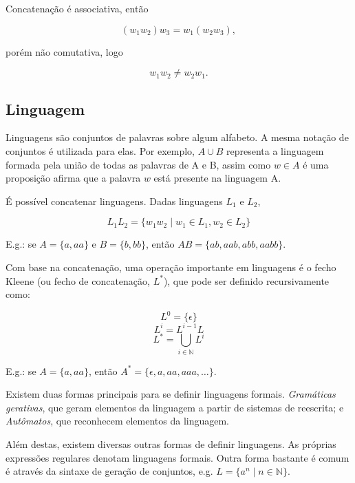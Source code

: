 \documentclass[a4paper,12pt,oneside,onecolumn]{uerj}
\begin{document}
Concatenação é associativa, então 

\begin{equation*}
(w_1w_2)w_3 = w_1(w_2w_3),
\end{equation*}

porém não comutativa, logo

\begin{equation*}
w_1w_2 \neq w_2w_1.
\end{equation*}

\subsection{Linguagem}

Linguagens são conjuntos de palavras sobre algum alfabeto. A mesma notação de conjuntos é utilizada para elas. Por exemplo, $A \cup B$ representa a linguagem formada pela união de todas as palavras de A e B, assim como $w \in A$ é uma proposição afirma que a palavra $w$ está presente na linguagem A.

É possível concatenar linguagens. Dadas linguagens $L_1$ e $L_2$,

\begin{equation*}
	L_1L_2 = \{w_1w_2 \mid w_1 \in L_1, w_2 \in L_2\}
\end{equation*}

E.g.: se $A = \{a, aa\}$ e $B = \{b, bb\}$, então $AB = \{ab, aab, abb, aabb\}$.


Com base na concatenação, uma operação importante em linguagens é o fecho Kleene (ou fecho de concatenação, $L^*$), que pode ser definido recursivamente como:

\begin{equation*}
	L^0 = \{\epsilon\}
\end{equation*}
\begin{equation*}
	L^i = L^{i-1}L
\end{equation*}
\begin{equation*}
	L^* = \bigcup_{i \in \mathbb{N}} L^i
\end{equation*}

E.g.: se $A = \{a, aa\}$, então $A^* = \{\epsilon, a, aa, aaa, \ldots\}$.

Existem duas formas principais para se definir linguagens formais. \emph{Gramáticas gerativas}, que geram elementos da linguagem a partir de sistemas de reescrita; e \emph{Autômatos}, que reconhecem elementos da linguagem. 

Além destas, existem diversas outras formas de definir linguagens. As próprias expressões regulares denotam linguagens formais. Outra forma bastante é comum é através da sintaxe de geração de conjuntos, e.g. $L=\{a^n \mid n \in \mathbb{N}\}$.
\end{document}
